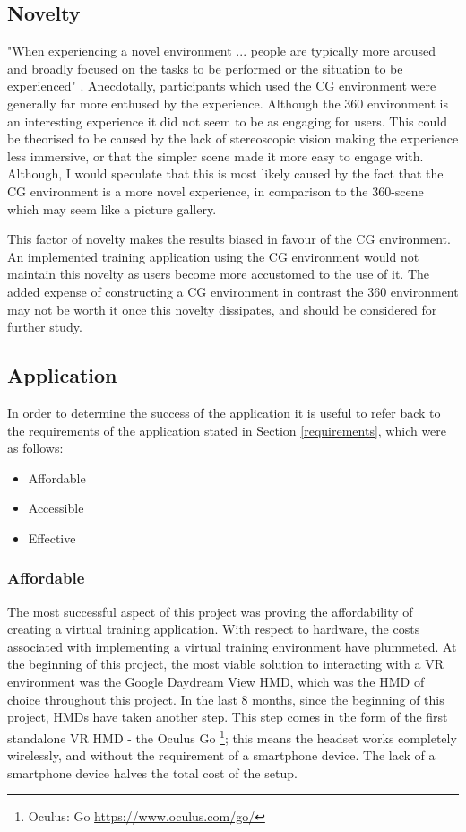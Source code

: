 \documentclass[ %
                    author={Elis Jones},
                supervisor={Dr. Kirsten Cater},
                    degree={BSc},
                     title={The Effect of Presentation Medium on Spatial Cognition},
                  subtitle={in the Virtual Environment},
                      year={2018} ]{dissertation}
\begin{document}
\subsection{Novelty}\label{novelty}
"When experiencing a novel environment ... people are typically more aroused and broadly focused on the tasks to be performed or the situation to be experienced" \citep{Witmer1998}. Anecdotally, participants which used the CG environment were generally far more enthused by the experience. Although the 360 environment is an interesting experience it did not seem to be as engaging for users. This could be theorised to be caused by the lack of stereoscopic vision making the experience less immersive, or that the simpler scene made it more easy to engage with. Although, I would speculate that this is most likely caused by the fact that the CG environment is a more novel experience, in comparison to the 360-scene which may seem like a picture gallery. 

This factor of novelty makes the results biased in favour of the CG environment. An implemented training application using the CG environment would not maintain this novelty as users become more accustomed to the use of it. The added expense of constructing a CG environment in contrast the 360 environment may not be worth it once this novelty dissipates, and should be considered for further study. 

\subsection{Application}

In order to determine the success of the application it is useful to refer back to the requirements of the application stated in Section \ref{requirements}, which were as follows:

\begin{itemize}
    \item Affordable
    \item Accessible
    \item Effective
\end{itemize}

\subsubsection{Affordable}
The most successful aspect of this project was proving the affordability of creating a virtual training application. With respect to hardware, the costs associated with implementing a virtual training environment have plummeted. At the beginning of this project, the most viable solution to interacting with a VR environment was the Google Daydream View HMD, which was the HMD of choice throughout this project. In the last 8 months, since the beginning of this project, HMDs have taken another step. This step comes in the form of the first standalone VR HMD - the Oculus Go \footnote{Oculus: Go \url{https://www.oculus.com/go/}}; this means the headset works completely wirelessly, and without the requirement of a smartphone device. The lack of a smartphone device halves the total cost of the setup. 
\end{document}
